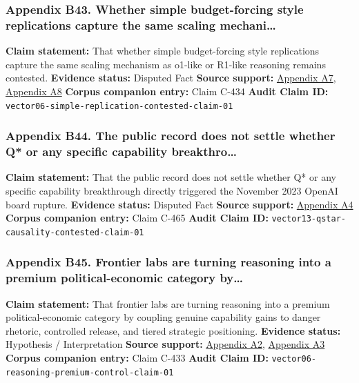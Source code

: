 \documentclass[
  american,
  11pt,
  letterpaper,
]{article}
\begin{document}
\subsubsection{Appendix B43. Whether simple budget-forcing style
replications capture the same scaling
mechani\ldots{}}\label{appendix-b43-whether-simple-budget-forcing-style-replications-capture-the-same-scaling-mechani}

\textbf{Claim statement:} That whether simple budget-forcing style
replications capture the same scaling mechanism as o1-like or R1-like
reasoning remains contested. \textbf{Evidence status:} Disputed Fact
\textbf{Source support:}
\hyperref[appendix-a7-s1-simple-test-time-scaling]{Appendix A7},
\hyperref[appendix-a8-it-s-not-that-simple-an-analysis-of-simple-test-time-scaling]{Appendix
A8} \textbf{Corpus companion entry:} Claim C-434 \textbf{Audit Claim
ID:} \texttt{vector06-simple-replication-contested-claim-01}

\subsubsection{Appendix B44. The public record does not settle whether
Q* or any specific capability
breakthro\ldots{}}\label{appendix-b44-the-public-record-does-not-settle-whether-q-or-any-specific-capability-breakthro}

\textbf{Claim statement:} That the public record does not settle whether
Q* or any specific capability breakthrough directly triggered the
November 2023 OpenAI board rupture. \textbf{Evidence status:} Disputed
Fact \textbf{Source support:}
\hyperref[appendix-a4-openai-researchers-warned-board-of-ai-breakthrough-ahead-of-ceo-ouster-sources-say]{Appendix
A4} \textbf{Corpus companion entry:} Claim C-465 \textbf{Audit Claim
ID:} \texttt{vector13-qstar-causality-contested-claim-01}

\subsubsection{Appendix B45. Frontier labs are turning reasoning into a
premium political-economic category
by\ldots{}}\label{appendix-b45-frontier-labs-are-turning-reasoning-into-a-premium-political-economic-category-by}

\textbf{Claim statement:} That frontier labs are turning reasoning into
a premium political-economic category by coupling genuine capability
gains to danger rhetoric, controlled release, and tiered strategic
positioning. \textbf{Evidence status:} Hypothesis / Interpretation
\textbf{Source support:}
\hyperref[appendix-a2-openai-o1-system-card]{Appendix A2},
\hyperref[appendix-a3-openai-acknowledges-new-models-increase-risk-of-misuse-to-create-bioweapons]{Appendix
A3} \textbf{Corpus companion entry:} Claim C-433 \textbf{Audit Claim
ID:} \texttt{vector06-reasoning-premium-control-claim-01}
\end{document}
